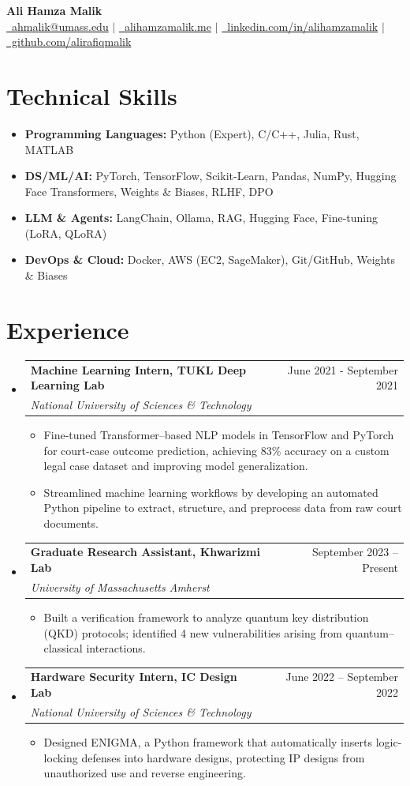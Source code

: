 \documentclass[letterpaper,11pt]{article}
\makeatletter
\newcommand{\resumeItem}[1]{%
  \item{#1 \vspace{-2pt}}%
}
\newcommand{\resumeSubheading}[4]{%
  \vspace{-2pt}\item
  \begin{tabular*}{0.989\textwidth}[t]{l@{\extracolsep{\fill}}r}
    \textbf{#1} & #2 \\
    \textit{\small #3} & \textit{\small #4} \\
  \end{tabular*}\vspace{-7pt}%
}
\newcommand{\resumeSubHeadingListStart}{\begin{itemize}[leftmargin=0.15in,label={},left=0pt]}
\newcommand{\resumeSubHeadingListEnd}{\end{itemize}}
\newcommand{\resumeItemListStart}{\begin{itemize}[left=10pt,itemsep=1.5pt]}
\newcommand{\resumeItemListEnd}{\end{itemize}\vspace{-5pt}}
\makeatother
\begin{document}
\begin{center}
    \textbf{\huge Ali Hamza Malik} \\ \vspace{5pt}
    \small
    \href{mailto:ahmalik@umass.edu}{\raisebox{-0.05\height}\faEnvelope \ ahmalik@umass.edu}
      $|$ \href{https://alihamzamalik.me/}{{\raisebox{-0.05\height}\faGlobeAmericas\ alihamzamalik.me}}
      $|$
      \href{https://linkedin.com/in/alihamzamalik}{\raisebox{-0.05\height}\faLinkedin\ linkedin.com/in/alihamzamalik}
      $|$ \href{https://github.com/alirafiqmalik}{\raisebox{-0.05\height}\faGithub  \ github.com/alirafiqmalik} 
      \vspace{-6pt}
\end{center}



\section{Technical Skills}
\resumeSubHeadingListStart
  \resumeItem{\textbf{Programming Languages:} Python (Expert), C/C++, Julia, Rust, MATLAB}
  \resumeItem{\textbf{DS/ML/AI:} PyTorch, TensorFlow, Scikit-Learn, Pandas, NumPy, Hugging Face Transformers, Weights \& Biases, RLHF, DPO}
  \resumeItem{\textbf{LLM \& Agents:} LangChain, Ollama, RAG, Hugging Face, Fine-tuning (LoRA, QLoRA)}
  \resumeItem{\textbf{DevOps \& Cloud:} Docker, AWS (EC2, SageMaker), Git/GitHub, Weights \& Biases}
\resumeSubHeadingListEnd

\section{Experience}
\resumeSubHeadingListStart
    \resumeSubheading
      {Machine Learning Intern, TUKL Deep Learning Lab}{June 2021 - September 2021}
      {National University of Sciences \& Technology}{}
      \resumeItemListStart
    \resumeItem{Fine-tuned Transformer–based NLP models in TensorFlow and PyTorch for court-case outcome prediction, achieving 83\% accuracy on a custom legal case dataset and improving model generalization.}
    \resumeItem{Streamlined machine learning workflows by developing an automated Python pipeline to extract, structure, and preprocess data from raw court documents.}
      \resumeItemListEnd
    \resumeSubheading
      {Graduate Research Assistant, Khwarizmi Lab}{September 2023 -- Present}
      {University of Massachusetts Amherst}{}
      \resumeItemListStart
    \resumeItem{Built a verification framework to analyze quantum key distribution (QKD) protocols; identified 4 new vulnerabilities arising from quantum–classical interactions.}
      \resumeItemListEnd
    \resumeSubheading
      {Hardware Security Intern, IC Design Lab}{June 2022 -- September 2022}
      {National University of Sciences \& Technology}{}
      \resumeItemListStart
    \resumeItem{Designed ENIGMA, a Python framework that automatically inserts logic-locking defenses into hardware designs, protecting IP designs from unauthorized use and reverse engineering.}
      \resumeItemListEnd
\resumeSubHeadingListEnd
\end{document}
